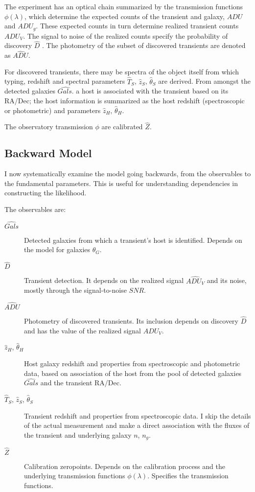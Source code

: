 \documentclass[preprint]{aastex}
\begin{document}
The experiment has an optical chain summarized by the transmission functions $\phi(\lambda)$, which determine the expected counts of the transient and galaxy, $\mathit{ADU}$ and
$\mathit{ADU}_g$.   These expected counts in turn determine realized  transient counts 
$\mathit{ADU}_V$.
The signal to noise of the realized counts specify the probability of discovery
$\hat{D}$ .    The photometry of the subset of discovered transients
are denoted as $\hat{\mathit{ADU}}$.

For discovered transients, there may be spectra of the object itself
from which typing, redshift and spectral parameters $\hat{T}_S$, $\hat{z}_S$, $\hat{\theta}_S$ are derived.
From amongst the detected galaxies $\hat{\mathit{Gals.}}$  a host is associated with the transient
based on its RA/Dec; the host information is summarized as the
host redshift (spectroscopic or photometric) and parameters $\hat{z}_{H}$, $\hat{\theta}_H$.

The observatory transmission $\phi$ are calibrated $\hat{Z}$.


\subsection{Backward Model}
 
I now systematically
examine the model going backwards, from the observables to the fundamental parameters.
This is useful for understanding dependencies in constructing the likelihood.

The observables are:
\begin{description}
\item[$\hat{\mathit{Gals}}$] Detected galaxies from which a transient's host is identified.
Depends on the model for galaxies $\theta_G$.
\item[$\hat{D}$] Transient detection.  It depends on
the realized signal $\hat{\mathit{ADU}_V}$ and its noise, mostly through the signal-to-noise
$\mathit{SNR}$.
\item[$\hat{\mathit{ADU}}$]  Photometry of discovered transients.  Its inclusion
depends on discovery $\hat{D}$ and has the value of the realized signal $\mathit{ADU}_V$.
\item[$\hat{z}_H$, $\hat{\theta}_H$] Host galaxy redshift and properties from spectroscopic
and photometric data, based on association
of the host from the pool of detected galaxies $\hat{\mathit{Gals}}$ and the transient RA/Dec.
\item[$\hat{T}_S$, $\hat{z}_S$, $\hat{\theta}_S$] Transient redshift and properties from
spectroscopic data. I skip the details of the actual measurement  and make a direct association
with the fluxes of the transient and underlying galaxy $n$, $n_g$.
\item[$\hat{Z}$] Calibration zeropoints.  Depends on the calibration process
and the underlying transmission functions $\phi(\lambda)$.  Specifies
the transmission functions.
\end{description}
\end{document}
